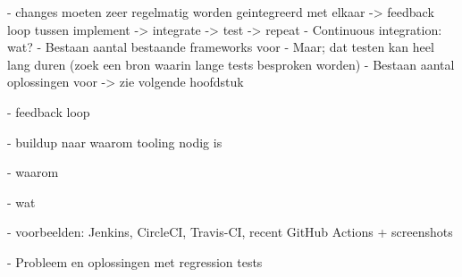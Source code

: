 - changes moeten zeer regelmatig worden geintegreerd met elkaar -> feedback loop tussen implement -> integrate -> test -> repeat
- Continuous integration: wat?
- Bestaan aantal bestaande frameworks voor
- Maar; dat testen kan heel lang duren (zoek een bron waarin lange tests besproken worden)
- Bestaan aantal oplossingen voor -> zie volgende hoofdstuk

- feedback loop

- buildup naar waarom tooling nodig is

- waarom

- wat

- voorbeelden: Jenkins, CircleCI, Travis-CI, recent GitHub Actions + screenshots

- Probleem en oplossingen met regression tests

